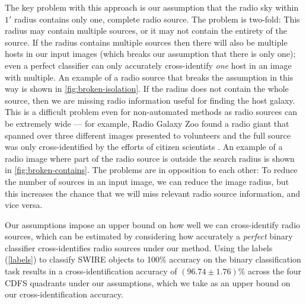 \documentclass[fleqn,usenatbib,usedcolumn]{mnras}
\begin{document}
    The key problem with this approach is our assumption that the radio sky
    within $1'$ radius contains only one, complete radio source. The problem is
    two-fold: This radius may contain multiple sources, or it may not contain
    the entirety of the source. If the radius contains multiple sources then
    there will also be multiple hosts in our input images (which breaks our
    assumption that there is only one); even a perfect classifier can only
    accurately cross-identify \emph{one} host in an image with multiple. An
    example of a radio source that breaks the assumption in this way is shown in
    \autoref{fig:broken-isolation}. If the radius does not contain the whole
    source, then we are missing radio information useful for finding the host
    galaxy. This is a difficult problem even for non-automated methods as radio
    sources can be extremely wide --- for example, Radio Galaxy Zoo found a
    radio giant that spanned over three different images presented to volunteers
    and the full source was only cross-identified by the efforts of citizen
    scientists \citep{banfield15}. An example of a radio image where part of the
    radio source is outside the search radius is shown in
    \autoref{fig:broken-contains}. The problems are in opposition to each other:
    To reduce the number of sources in an input image, we can reduce the image
    radius, but this increases the chance that we will miss relevant radio
    source information, and vice versa.

    Our assumptions impose an upper bound on how well we can cross-identify
    radio sources, which can be estimated by considering how accurately a
    \emph{perfect} binary classifier cross-identifies radio sources under our
    method. Using the \citet{norris06} labels (\autoref{labels}) to classify
    SWIRE objects to 100\% accuracy on the binary classification task results in
    a cross-identification accuracy of $(96.74 \pm 1.76)\%$ across the four CDFS
    quadrants under our assumptions, which we take as an upper bound on our
    cross-identification accuracy.
\end{document}
